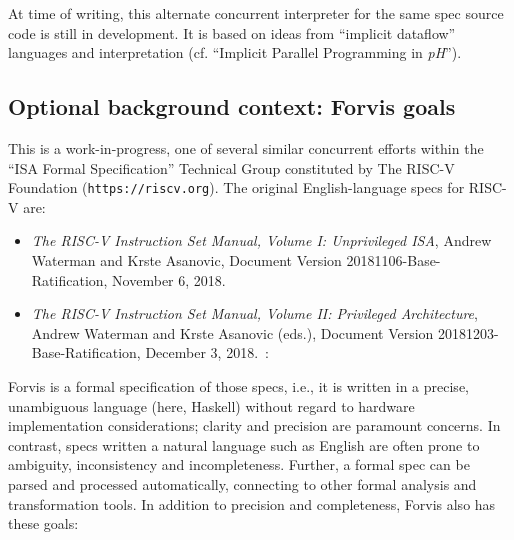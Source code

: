 \documentclass[11pt]{article}
\begin{document}
At time of writing, this alternate concurrent interpreter for the same
spec source code is still in development.  It is based on ideas from
``implicit dataflow'' languages and interpretation (cf.  ``Implicit
Parallel Programming in \emph{pH}''\cite{Nikhil2000a}).


\subsection{Optional background context: Forvis goals}

This is a work-in-progress, one of several similar concurrent efforts
within the ``ISA Formal Specification'' Technical Group constituted by
The RISC-V Foundation ({\tt https://riscv.org}).  The original
English-language specs for RISC-V are:
\begin{itemize}

\item {\it The RISC-V Instruction Set Manual, Volume I: Unprivileged ISA},
    Andrew Waterman and Krste Asanovic,
    Document Version 20181106-Base-Ratification,
    November 6, 2018.~\cite{Waterman2018_user}

\item {\it The RISC-V Instruction Set Manual, Volume II: Privileged
    Architecture}, 
    Andrew Waterman and Krste Asanovic (eds.),
    Document Version 20181203-Base-Ratification,
    December 3, 2018.~\cite{Waterman2018_priv}:

\end{itemize}

Forvis is a formal specification of those specs, i.e., it is written
in a precise, unambiguous language (here, Haskell) without regard to
hardware implementation considerations; clarity and precision are
paramount concerns.  In contrast, specs written a natural language
such as English are often prone to ambiguity, inconsistency and
incompleteness.  Further, a formal spec can be parsed and processed
automatically, connecting to other formal analysis and transformation
tools.  In addition to precision and completeness, Forvis also has
these goals:
\end{document}
